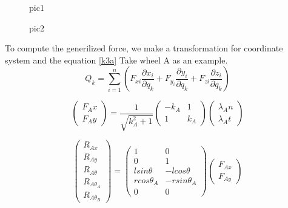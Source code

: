 \documentclass[12 pt]{article}
\begin{document}
\begin{figure}[htbp]
\begin{center}
 
\caption{pic1}
\label{figure:sdd}
\end{center}
\end{figure}

\begin{figure}[htbp]
\begin{center}
 
\caption{pic2}
\label{figure:sdd}
\end{center}
\end{figure}

To compute the generilized force, we make a transformation for coordinate system and the equation \ref{k3a}
Take wheel A as an example.
\begin{equation}
Q_{k}=\sum_{i=1}^n (F_{xi}\frac{\partial x_{i}}{\partial q_k}+F_{y_i}\frac{\partial y_{i}}{\partial q_k}+F_{zi}\frac{\partial z_{i}}{\partial q_k})
\label{k3a}
\end{equation}

\begin{equation}
\begin{pmatrix}
F_Ax\\F_Ay
\end{pmatrix}=
\frac{1}{\sqrt{k_A^2+1}}\begin{pmatrix}
-k_A & 1\\
1 & k_A \end{pmatrix}
\begin{pmatrix}
\lambda_An \\ \lambda_At
\label{k2a}
\end{pmatrix}
\end{equation}

\begin{equation}
\begin{pmatrix}
R_{Ax}\\ R_{Ay}\\ R_{A\theta} \\R_{A\theta_A}\\ R_{A\theta_B}
\end{pmatrix}=\begin{pmatrix}
1 & 0 \\
0 & 1 \\
lsin\theta & -lcos\theta \\
rcos\theta_A & -rsin\theta_A \\
0 & 0 \end{pmatrix}
\begin{pmatrix}
F_{Ax} \\ F_{Ay}
\label{k1a}
\end{pmatrix}
\end{equation}
\end{document}
